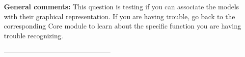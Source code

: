 \documentclass{extbook}[14pt]
\begin{document}
\textbf{General comments:} This question is testing if you can associate the models with their graphical representation. If you are having trouble, go back to the corresponding Core module to learn about the specific function you are having trouble recognizing.

-----------------------------------------------
\end{document}
